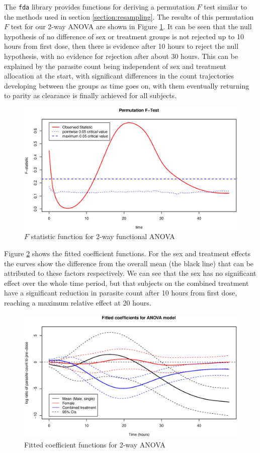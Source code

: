 The \texttt{fda} library provides functions for deriving a permutation $F$ test similar to the methods used in section \ref{section:resampling}. The results of this permutation $F$ test for our 2-way ANOVA are shown in Figure \ref{fdapermF}. It can be seen that the null hypothesis of no difference of sex or treatment groups is not rejected up to 10 hours from first dose, then there is evidence after 10 hours to reject the null hypothesis, with no evidence for rejection after about 30 hours. This can be explained by the parasite count being independent of sex and treatment allocation at the start, with significant differences in the count trajectories developing between the groups as time goes on, with them eventually returning to parity as clearance is finally achieved for all subjects.
\begin{figure}[h]
\includegraphics[width=150mm]{fdapermF.eps} 
\caption{$F$ statistic function for 2-way functional ANOVA}
\label{fdapermF}
\end{figure}

Figure \ref{fdcoef} shows the fitted coefficient functions. For the sex and treatment effects the curves show the difference from the overall mean (the black line) that can be attributed to these factors respectively. We can see that the sex has no significant effect over the whole time period, but that subjects on the combined treatment have a significant reduction in parasite count after 10 hours from first dose, reaching a maximum relative effect at 20 hours.
\begin{figure}[p]
\includegraphics[width=150mm]{fdcoef.eps} 
\caption{Fitted coefficient functions for 2-way ANOVA}
\label{fdcoef}
\end{figure}

